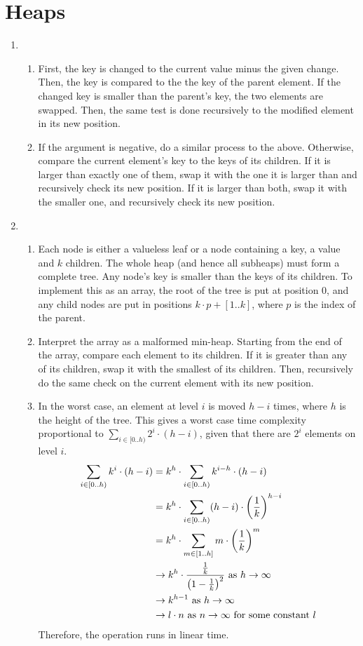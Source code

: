\documentclass[11pt]{article}
\begin{document}
\section{Heaps}
\begin{enumerate}
\item \begin{enumerate}
  \item First, the key is changed to the current value minus the given change. Then, the key is compared to the the key of the parent element. If the changed key is smaller than the parent's key, the two elements are swapped. Then, the same test is done recursively to the modified element in its new position.
  \item If the argument is negative, do a similar process to the above. Otherwise, compare the current element's key to the keys of its children. If it is larger than exactly one of them, swap it with the one it is larger than and recursively check its new position. If it is larger than both, swap it with the smaller one, and recursively check its new position.
  \end{enumerate}
\item \begin{enumerate}
  \item Each node is either a valueless leaf or a node containing a key, a value and \(k\) children. The whole heap (and hence all subheaps) must form a complete tree. Any node's key is smaller than the keys of its children. To implement this as an array, the root of the tree is put at position \(0\), and any child nodes are put in positions \(k\cdot p+[1..k]\), where \(p\) is the index of the parent.
  \item Interpret the array as a malformed min-heap. Starting from the end of the array, compare each element to its children. If it is greater than any of its children, swap it with the smallest of its children. Then, recursively do the same check on the current element with its new position.
  \item In the worst case, an element at level \(i\) is moved \(h-i\) times, where \(h\) is the height of the tree. This gives a worst case time complexity proportional to \(\sum_{i\in[0..h)}2^i\cdot(h-i)\), given that there are \(2^i\) elements on level \(i\).
    \[\begin{aligned}
      \sum_{i\in[0..h)}k^i\cdot(h-i)&=k^h\cdot\sum_{i\in[0..h)}k^{i-h}\cdot(h-i) \\
      &=k^h\cdot\sum_{i\in[0..h)}(h-i)\cdot\left( 1\over k \right)^{h-i} \\
      &=k^h\cdot\sum_{m\in[1..h]}m\cdot\left( 1\over k \right)^m \\
      &\to k^h\cdot\frac{\frac{1}{k}}{\left(1-\frac{1}{k}\right)^2} \textrm{ as } h\to\infty \\
      &\to k^{h-1} \textrm{ as } h\to\infty \\
      &\to l\cdot n \textrm{ as } n\to\infty \textrm{ for some constant } l
    \end{aligned}\]
    Therefore, the operation runs in linear time.
  \end{enumerate}
\end{enumerate}
\end{document}
